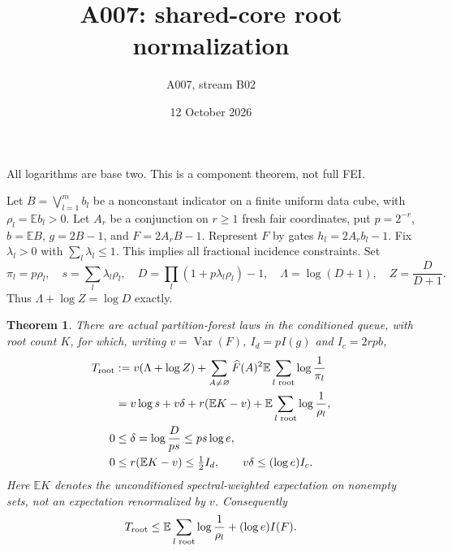 \documentclass[11pt]{article}
\newtheorem{theorem}{Theorem}
\newcommand{\E}{\mathbb E}
\begin{document}
\title{A007: shared-core root normalization}
\author{A007, stream B02}
\date{12 October 2026}
\maketitle
All logarithms are base two. This is a component theorem, not full FEI.

Let $B=\bigvee_{l=1}^m b_l$ be a nonconstant indicator on a finite uniform
data cube, with $\rho_l=\E b_l>0$. Let $A_r$ be a conjunction on $r\ge1$
fresh fair coordinates, put $p=2^{-r}$, $b=\E B$, $g=2B-1$, and
$F=2A_rB-1$. Represent $F$ by gates $h_l=2A_rb_l-1$.
Fix $\lambda_l>0$ with $\sum_l\lambda_l\le1$. This implies all fractional
incidence constraints. Set
\[
 \pi_l=p\rho_l,\quad s=\sum_l\lambda_l\rho_l,\quad
 D=\prod_l(1+p\lambda_l\rho_l)-1,\quad
 \Lambda=\log(D+1),\quad Z=\frac D{D+1}.
\]
Thus $\Lambda+\log Z=\log D$ exactly.
\begin{theorem}
There are actual partition-forest laws in the conditioned queue, with
root count $K$, for which, writing $v=\operatorname{Var}(F)$,
$I_d=pI(g)$ and $I_c=2rpb$,
\begin{align*}
 T_{\rm root}
 &: =v(\Lambda+\log Z)
     +\sum_{A\ne\varnothing}\widehat F(A)^2
        \E\sum_{l\text{ root}}\log\frac1{\pi_l}\\
 &=v\log s+v\delta+r(\E K-v)
       +\E\sum_{l\text{ root}}\log\frac1{\rho_l},\\
 0&\le\delta=\log\frac D{ps}\le ps\log e,\\
 0&\le r(\E K-v)\le \tfrac12 I_d,
 \qquad v\delta\le(\log e)I_c.
\end{align*}
Here $\E K$ denotes the unconditioned spectral-weighted expectation on
nonempty sets, not an expectation renormalized by $v$.
Consequently
\[
 T_{\rm root}\le
 \E\sum_{l\text{ root}}\log\frac1{\rho_l}
       +(\log e)I(F).
\]
\end{theorem}
\end{document}
